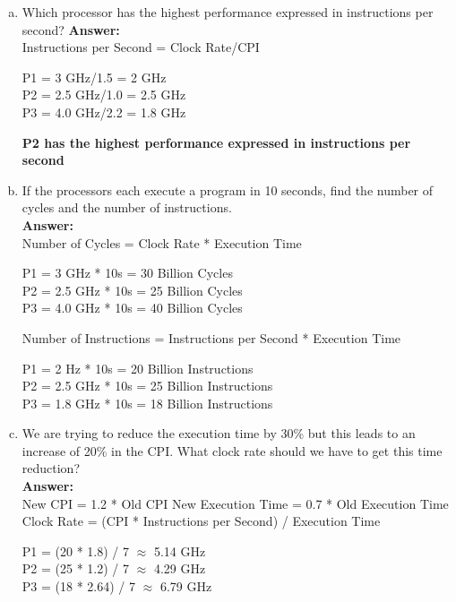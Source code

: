 \documentclass[12pt]{article}
\begin{document}
\begin{enumerate}[(a)]
    \item Which processor has the highest performance expressed in instructions per second?
    \textbf{Answer:}
    \\
    Instructions per Second = Clock Rate/CPI
        \begin{center}
            P1 = 3 GHz/1.5 = 2 GHz\\
            P2 = 2.5 GHz/1.0 = 2.5 GHz\\
            P3 = 4.0 GHz/2.2 = 1.8 GHz\\
        \end{center}
    \textbf{P2 has the highest performance expressed in instructions per second}
    
    \item If the processors each execute a program in 10 seconds, find the number of cycles and the number of instructions.
    \\
    \textbf{Answer:}
    \\
    Number of Cycles = Clock Rate * Execution Time
        \begin{center}
            P1 = 3 GHz * 10s = 30 Billion Cycles\\
            P2 = 2.5 GHz * 10s = 25 Billion Cycles\\
            P3 = 4.0 GHz * 10s = 40 Billion Cycles\\
        \end{center}
    
    Number of Instructions = Instructions per Second * Execution Time
        \begin{center}
            P1 = 2 Hz * 10s = 20 Billion Instructions\\
            P2 = 2.5 GHz * 10s = 25 Billion Instructions\\
            P3 = 1.8 GHz * 10s = 18 Billion Instructions\\
        \end{center}

    \item We are trying to reduce the execution time by 30\% but this leads to an increase of 20\% in the CPI. What clock rate should we have to get this time reduction?
    \\
    \textbf{Answer:}
    \\
    New CPI = 1.2 * Old CPI
    New Execution Time = 0.7 * Old Execution Time
    Clock Rate = (CPI * Instructions per Second) / Execution Time
        \begin{center}
            P1 = (20 * 1.8) / 7 $\approx$ 5.14 GHz\\
            P2 = (25 * 1.2) / 7 $\approx$ 4.29 GHz\\
            P3 = (18 * 2.64) / 7 $\approx$ 6.79 GHz\\
        \end{center}

\end{enumerate}
\end{document}
